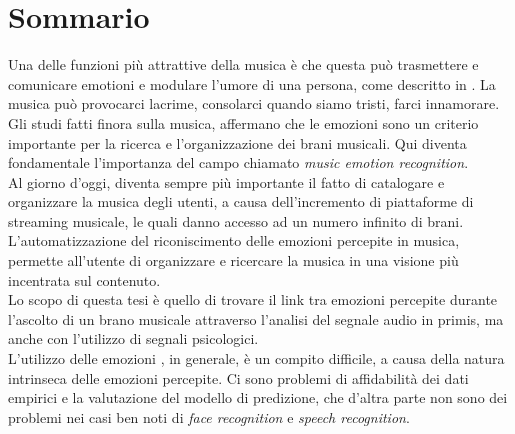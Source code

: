 \chapter{Sommario}
\label{Sommario}

\thispagestyle{empty}

\indent Una delle funzioni più attrattive della musica è che questa può trasmettere e comunicare emotioni e modulare l'umore di una persona, come descritto in \cite{feng2003popular}. La musica può provocarci lacrime, consolarci quando siamo tristi, farci innamorare.
\\
Gli studi fatti finora sulla musica, affermano che le emozioni sono un criterio importante per la ricerca e l'organizzazione dei brani musicali. Qui diventa fondamentale l'importanza del campo chiamato \textit{music emotion recognition}.
\\ \indent
Al giorno d'oggi, diventa sempre più importante il fatto di catalogare e organizzare la musica degli utenti, a causa dell'incremento di piattaforme di streaming musicale, le quali danno accesso ad un numero infinito di brani.
\\
L'automatizzazione del riconiscimento delle emozioni percepite in musica, permette all'utente di organizzare e ricercare la musica in una visione più incentrata sul contenuto.
\\ \indent
Lo scopo di questa tesi è quello di trovare il link tra emozioni percepite durante l'ascolto di un brano musicale attraverso l'analisi del segnale audio in primis, ma anche con l'utilizzo di segnali psicologici.
\\ \indent
L'utilizzo delle emozioni , in generale, è un compito difficile, a causa della natura intrinseca delle emozioni percepite. Ci sono problemi di affidabilità dei dati empirici e la valutazione del modello di predizione, che d'altra parte non sono dei problemi nei casi ben noti di \textit{face recognition} e \textit{speech recognition}.